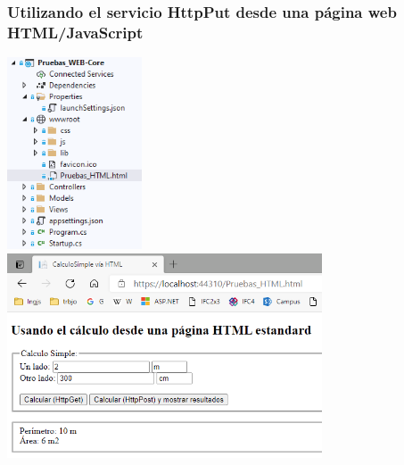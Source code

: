 \documentclass[spanish,12pt,a4paper,final,oneside]{book}
\begin{document}
\subsubsection{Utilizando el servicio HttpPut desde una página web HTML/JavaScript}
\includegraphics[width=0.3\textwidth]{HttpPut_web_codigo.png} 
\includegraphics[width=0.7\textwidth]{HttpPut_web_pantallazo.png} 

\end{document}
